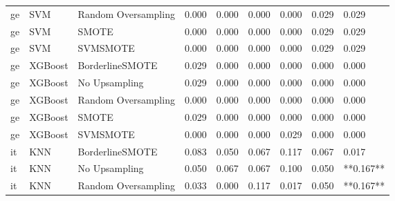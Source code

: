 \begin{tabular}{lllllllll}
      ge &                          SVM & Random Oversampling & 0.000 &                     0.000 &                 0.000 &                  0.000 &                                   0.029 &     0.029 \\
      ge &                          SVM &               SMOTE & 0.000 &                     0.000 &                 0.000 &                  0.000 &                                   0.029 &     0.029 \\
      ge &                          SVM &            SVMSMOTE & 0.000 &                     0.000 &                 0.000 &                  0.000 &                                   0.029 &     0.029 \\
      ge &                      XGBoost &     BorderlineSMOTE & 0.029 &                     0.000 &                 0.000 &                  0.000 &                                   0.000 &     0.000 \\
      ge &                      XGBoost &       No Upsampling & 0.029 &                     0.000 &                 0.000 &                  0.000 &                                   0.000 &     0.000 \\
      ge &                      XGBoost & Random Oversampling & 0.000 &                     0.000 &                 0.000 &                  0.000 &                                   0.000 &     0.000 \\
      ge &                      XGBoost &               SMOTE & 0.029 &                     0.000 &                 0.000 &                  0.000 &                                   0.000 &     0.000 \\
      ge &                      XGBoost &            SVMSMOTE & 0.000 &                     0.000 &                 0.000 &                  0.029 &                                   0.000 &     0.000 \\
      it &                          KNN &     BorderlineSMOTE & 0.083 &                     0.050 &                 0.067 &                  0.117 &                                   0.067 &     0.017 \\
      it &                          KNN &       No Upsampling & 0.050 &                     0.067 &                 0.067 &                  0.100 &                                   0.050 & **0.167** \\
      it &                          KNN & Random Oversampling & 0.033 &                     0.000 &                 0.117 &                  0.017 &                                   0.050 & **0.167** \\

\end{tabular}
